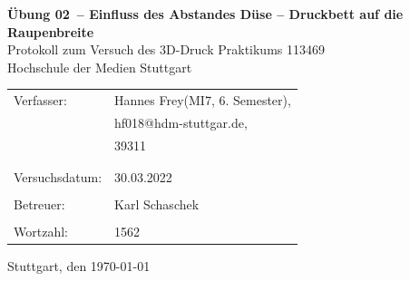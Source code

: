 \documentclass[a4paper,12pt,bibtotocnumbered]{scrartcl}
\makeatletter
\numberwithin{equation}{section} %
\newcommand{\VERSUCHSDATUM}{30.03.2022}
\newcommand{\PROTOKOLLDATUM}{\today}
\newcommand{\VerfasserEINS}{Hannes Frey}
\newcommand{\MatNoEINS}{39311}
\newcommand{\StudiengangEINS}{MI7}
\newcommand{\SemesterEINS}{6. Semester}
\newcommand{\MailEINS}{hf018@hdm-stuttgar.de}
\newcommand{\VerfasserZWEI}{Verfasser 2}
\newcommand{\MatNoZWEI}{Matrikelnummer 2}
\newcommand{\StudiengangZWEI}{Technologiemanagement}
\newcommand{\BETREUER}{Karl Schaschek}
\newcommand{\WORTZAHL}{1562}
\newcommand{\GRUPPENNR}{Z-999}
\newcommand{\VERSUCHSNR}{Übung 02}
\newcommand{\VERSUCHSNAME}{Einfluss des Abstandes Düse – Druckbett auf die Raupenbreite}
\makeatother
\begin{document}
\thispagestyle{empty}


\begin{titlepage}

\begin{center}
\Huge{\textbf{\VERSUCHSNR\ – \VERSUCHSNAME}}\\%
\vspace{10mm}%
\Large{Protokoll zum Versuch des 3D-Druck Praktikums 113469  %
}\\
\vspace{10mm} 
\Large{Hochschule der Medien Stuttgart}\\
\end{center}
\vspace{1cm}
\begin{center}
\begin{tabular}{ll}
\large{Verfasser:}		& \large{\VerfasserEINS\;(\StudiengangEINS, \SemesterEINS),} \\ 
						& \large{\MailEINS}, \\
 						& \large{\MatNoEINS} \\
						\vspace{0cm}\\
\vspace{0cm}\\
\large{Versuchsdatum:}	& \large{\VERSUCHSDATUM} \\
\vspace{0cm}\\
\large{Betreuer:}		& \large{\BETREUER} \\
\vspace{0cm}\\
\large{Wortzahl:}		& \large{\WORTZAHL}
\end{tabular}
\end{center}
\vspace{60mm}

\begin{center}
Stuttgart, den \PROTOKOLLDATUM
\end{center}

\end{titlepage}
\end{document}
